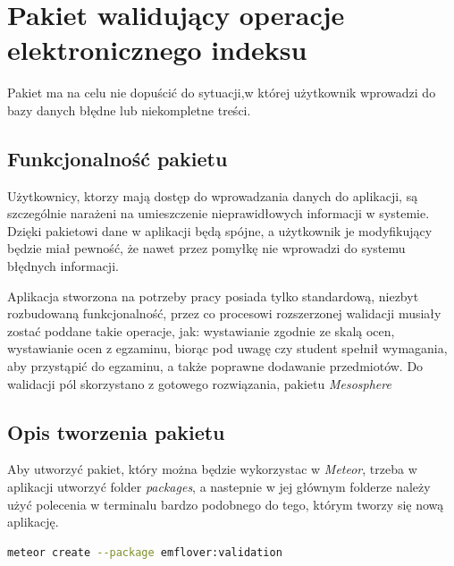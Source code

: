 \documentclass[openright]{xmgr}
\begin{document}
\chapter{Pakiet walidujący operacje elektronicznego indeksu}
\indent \indent \indent Pakiet ma na celu nie dopuścić do sytuacji,w której użytkownik wprowadzi do bazy danych błędne lub niekompletne treści.
\section{Funkcjonalność pakietu}

\indent \indent \indent Użytkownicy, ktorzy mają dostęp do wprowadzania danych do aplikacji, są szczególnie narażeni na umieszczenie nieprawidłowych informacji w systemie. Dzięki pakietowi dane w aplikacji będą spójne, a użytkownik je modyfikujący będzie miał pewność, że nawet przez pomyłkę nie wprowadzi do systemu błędnych informacji.

\indent Aplikacja stworzona na potrzeby pracy posiada tylko standardową, niezbyt rozbudowaną funkcjonalność, przez co procesowi rozszerzonej walidacji musiały zostać poddane takie operacje, jak: wystawianie zgodnie ze skalą ocen, wystawianie ocen z egzaminu, biorąc pod uwagę czy student spełnił wymagania, aby przystąpić do egzaminu, a także poprawne dodawanie przedmiotów. Do walidacji pól skorzystano z gotowego rozwiązania, pakietu \textit{Mesosphere}
\section{Opis tworzenia pakietu}

\indent \indent \indent Aby utworzyć pakiet, który można będzie wykorzystac w \textit{Meteor}, trzeba w aplikacji utworzyć folder \textit{packages}, a nastepnie w jej  głównym folderze należy użyć polecenia w terminalu bardzo podobnego do tego, którym tworzy się nową aplikację.

\newpage

\begin{lstlisting}[language=bash]
meteor create --package emflover:validation
\end{lstlisting}
\end{document}
